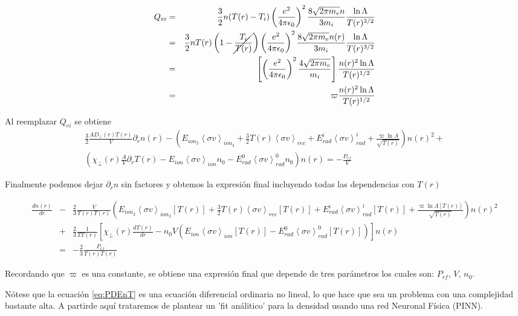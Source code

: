   \begin{eqnarray}
    Q_{ei} &=& \frac{3}{2}n(T(r) - T_i) \left(\frac{e^2}{4\pi\epsilon_0}\right)^2\frac{8\sqrt{2\pi m_e}n}{3 m_i}\frac{\ln{\Lambda}}{T(r)^{3/2}} \nonumber \\
           &=& \frac{3}{2}nT(r)\left(1 - \cancel{\frac{T_i}{T(r)}}\right) \left(\frac{e^2}{4\pi\epsilon_0}\right)^2\frac{8\sqrt{2\pi m_e}n(r)}{3 m_i}\frac{\ln{\Lambda}}{T(r)^{3/2}} \nonumber \\
           &=& \left[\left(\frac{e^2}{4\pi\epsilon_0}\right)^2\frac{4\sqrt{2\pi m_e}}{m_i}\right]\frac{n(r)^2\ln{\Lambda}}{T(r)^{1/2}} \nonumber \\
           &=& \varpi\frac{n(r)^2\ln{\Lambda}}{T(r)^{1/2}}\label{eq:Qie2}
  \end{eqnarray}

  Al reemplazar $Q_{ei}$ se obtiene
  \begin{eqnarray*}
    \frac{3}{2}\frac{AD_\perp(r) T(r)}{V}\partial_r n(r) - \left(E_{ion_2}\left<\sigma v\right>_{ion_2} + \frac{3}{2}T(r)\left<\sigma v\right>_{rec} + E_{rad}^i\left<\sigma v\right>_{rad}^i + \frac{\varpi \ln{\Lambda}}{\sqrt{T(r)}}\right)n(r)^2 + \\ \left(\chi_\perp(r)\frac{A}{V}\partial_r T(r) - E_{ion}\left<\sigma v\right>_{ion}n_0 - E_{rad}^0\left<\sigma v\right>_{rad}^0n_0\right)n(r) = - \frac{P_{rf}}{V}
  \end{eqnarray*}

  Finalmente podemos dejar $\partial_r n$ sin factores y obtemos la expresi\'on final incluyendo todas las dependencias con $T(r)$

  \begin{eqnarray}\label{eq:PDEnT}
    \frac{dn(r)}{dr} &-& \frac{2}{3}\frac{V}{\varUpsilon(r) T(r)}\left(E_{ion_2}\left<\sigma v\right>_{ion_2}[T(r)] + \frac{3}{2}T(r)\left<\sigma v\right>_{rec}[T(r)] + E_{rad}^i\left<\sigma v\right>_{rad}^i[T(r)] + \frac{\varpi\ln{\Lambda}[T(r)]}{\sqrt{T(r)}}\right)n(r)^2  \nonumber\\ &+& \frac{2}{3}\frac{1}{\varUpsilon T(r)}\left[\chi_\perp(r)\frac{dT(r)}{dr} - n_0V\left(E_{ion}\left<\sigma v\right>_{ion}[T(r)] - E_{rad}^0\left<\sigma v\right>_{rad}^0[T(r)]\right)\right]n(r) \nonumber\\ &=& -\frac{2}{3}\frac{P_{rf}}{\varUpsilon(r) T(r)}
  \end{eqnarray}

  Recordando que $\varpi$ es una constante, se obtiene una expresi\'on final que depende de tres par\'ametros los cuales son: $P_{rf}$, $V$, $n_0$. 

  N\'otese que la ecuaci\'on \eqref{eq:PDEnT} es una ecuaci\'on diferencial ordinaria no lineal, lo que hace que sea un problema con una complejidad bastante alta. A partirde aqu\'i trataremos de plantear un 'fit an\'alitico' para la densidad usando una red Neuronal F\'isica (PINN). 
